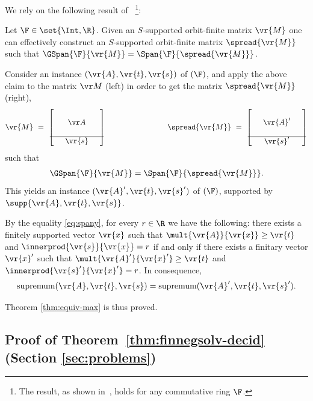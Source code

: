 We rely on the following result of~\cite{GHL22}%
\footnote{The result, as shown in~\cite{GHL22}, holds for any commutative ring $\F$.}:
%
\begin{claim}
Let $\F \in\set{\Int,\R}$.
Given an $S$-supported orbit-finite matrix $\vr{M}$ one can effectively construct an $S$-supported orbit-finite matrix $\spread{\vr{M}}$
such that $\GSpan{\F}{\vr{M}} = \Span{\F}{\spread{\vr{M}}}$.
\end{claim}
%
Consider an instance $(\vr{A},\vr{t},\vr{s})$ of \ineqmaxname$(\F)$, and
apply the above claim to the matrix $\vr M$ (left) 
in order to get the matrix $\spread{\vr{M}}$ (right),
\[
\vr{M} \ = \ 
\left[
\begin{matrix}
            &        &  \\
            & \vr A  &  \\
            &        &  \\
              \hline
\phantom{1} & \vr{s} & \phantom{1}
\end{matrix}
\right]
\qquad\qquad\qquad\qquad
\spread{\vr{M}} \ = \ 
\left[
\begin{matrix}
            &                  &  \\
            & \vr {A}' &  \\
            &                  &  \\
              \hline
\phantom{1} & \vr{s}'  & \phantom{1}
\end{matrix}
\right]
\]
such that
\begin{align} \label{eq:spany}
\GSpan{\F}{\vr{M}} =
\Span{\F}{\spread{\vr{M}}}.
\end{align}
This yields 
an instance  $(\vr{A}',\vr{t},\vr{s}')$  of \finineqmaxname$(\F)$, supported 
by $\supp{\vr{A},\vr{t},\vr{s}}$.

By the equality \eqref{eq:spany},
for every $r \in \R$ we have the following:
there exists a finitely supported vector $\vr{x}$ such that 
$\mult{\vr{A}}  {\vr{x}} \geq \vr{t}$ and $\innerprod{\vr{s}}  {\vr{x}} = r$ 
if and only if
there exists a finitary vector $\vr{x}'$ such that $\mult{\vr{A}'}  {\vr{x}'} \geq \vr{t}$ and 
$\innerprod {\vr{s}'}  {\vr{x}'} = r$.
In consequence,
\[
\text{supremum}(\vr{A},\vr{t},\vr{s}) =
\text{supremum}(\vr{A}',\vr{t},\vr{s}').
\]

Theorem \ref{thm:equiv-max} is thus proved.


\subsection{Proof of Theorem~\ref{thm:finnegsolv-decid} (Section \ref{sec:problems})}
\label{sec:problems-proofs-two}

